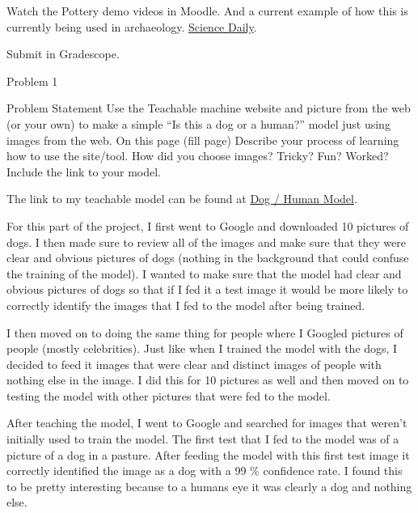Watch the Pottery demo videos in Moodle. And a current example of how this is currently being used in archaeology. \href{https://www.sciencedaily.com/releases/2021/05/210517144704.htm}{Science Daily}. \vspace*{1em}

\noindent Submit in Gradescope.

\begin{problem}{Problem 1}
    \begin{statement}{Problem Statement}
        Use the Teachable machine website and picture from the web (or your own) to make a simple “Is this a dog or a human?” model just using images from the web. On this page (fill page) Describe 
        your process of learning how to use the site/tool. How did you choose images? Tricky? Fun? Worked? Include the link to your model.
    \end{statement}

    \begin{highlight}[Solution]
        The link to my teachable model can be found at \href{https://teachablemachine.withgoogle.com/models/seDY1zadK/}{Dog / Human Model}.
        
        For this part of the project, I first went to Google and downloaded 10 pictures of dogs. I then made sure to review all of the images and make sure that they were clear and obvious pictures 
        of dogs (nothing in the background that could confuse the training of the model). I wanted to make sure that the model had clear and obvious pictures of dogs so that if I fed it a test image
        it would be more likely to correctly identify the images that I fed to the model after being trained.

        I then moved on to doing the same thing for people where I Googled pictures of people (mostly celebrities). Just like when I trained the model with the dogs, I decided to feed it images
        that were clear and distinct images of people with nothing else in the image. I did this for 10 pictures as well and then moved on to testing the model with other pictures that were fed to the
        model.

        After teaching the model, I went to Google and searched for images that weren't initially used to train the model. The first test that I fed to the model was of a picture of a dog in a pasture.
        After feeding the model with this first test image it correctly identified the image as a dog with a 99 \% confidence rate. I found this to be pretty interesting because to a humans eye it was
        clearly a dog and nothing else.


\end{highlight}
\end{problem}
